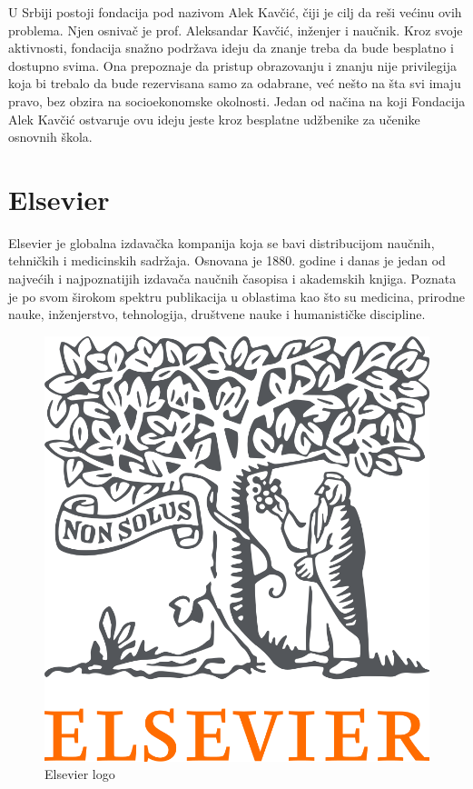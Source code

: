 \documentclass{article}
\begin{document}
U Srbiji postoji fondacija pod nazivom Alek Kavčić, čiji je cilj da reši većinu ovih problema\cite{alekfondacija}. Njen osnivač je prof. Aleksandar Kavčić, inženjer i naučnik. Kroz svoje aktivnosti, fondacija snažno podržava ideju da znanje treba da bude besplatno i dostupno svima. Ona prepoznaje da pristup obrazovanju i znanju nije privilegija koja bi trebalo da bude rezervisana samo za odabrane, već nešto na šta svi imaju pravo, bez obzira na socioekonomske okolnosti. Jedan od načina na koji Fondacija Alek Kavčić ostvaruje ovu ideju jeste kroz besplatne udžbenike za učenike osnovnih škola.


\section{Elsevier}

Elsevier je globalna izdavačka kompanija koja se bavi distribucijom naučnih, tehničkih i medicinskih sadržaja. Osnovana je 1880. godine i danas je jedan od najvećih i najpoznatijih izdavača naučnih časopisa i akademskih knjiga. Poznata je po svom širokom spektru publikacija u oblastima kao što su medicina, prirodne nauke, inženjerstvo, tehnologija, društvene nauke i humanističke discipline.

\begin{figure}[htbp]
    \center
    \includegraphics[scale=0.15]{img/elsevier-logo.png}
    \caption{Elsevier logo}
\end{figure}
\end{document}
